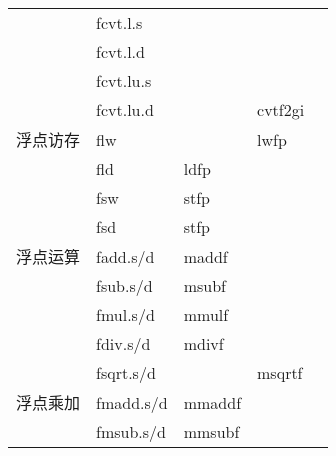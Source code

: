 \begin{longtable}{lllll}
                               & fcvt.l.s                         &                              &                                \\
                               & fcvt.l.d                         &                              &                                \\
                               & fcvt.lu.s                        &                              &                                \\
                               & fcvt.lu.d                        & \multirow{-8}{*}{}           & \multirow{-8}{*}{cvtf2gi}      \\
    \hline
    浮点访存                       & flw                              &                              & lwfp                           \\
                               & fld                              & ldfp                         &                                \\
                               & fsw                              & stfp                         &                                \\
                               & fsd                              & stfp                         &                                \\
                               \hline
    浮点运算                       & fadd.s/d                         & maddf                        &                                \\
                               & fsub.s/d                         & msubf                        &                                \\
                               & fmul.s/d                         & mmulf                        &                                \\
                               & fdiv.s/d                         & mdivf                        &                                \\
                               & fsqrt.s/d                        &                              & msqrtf                         \\
                               \hline
    浮点乘加                       & fmadd.s/d                        & mmaddf                       &                                \\
                               & fmsub.s/d                        & mmsubf                       &                                \\

\end{longtable}
